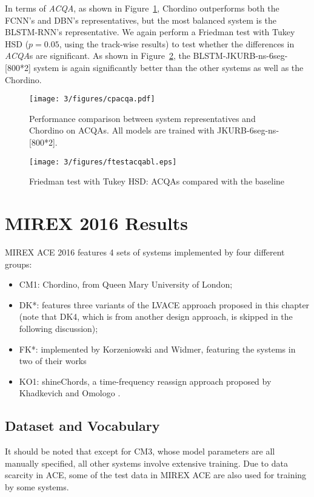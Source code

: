 In terms of \textit{ACQA}, as shown in Figure~\ref{fig:3-acqachordino}, Chordino outperforms both the FCNN's and DBN's representatives, but the most balanced system is the BLSTM-RNN's representative. We again perform a Friedman test with Tukey HSD ($p=0.05$, using the track-wise results) to test whether the differences in \textit{ACQA}s are significant. As shown in Figure~\ref{fig:3-friedmanacqabl}, the BLSTM-JKURB-ns-6seg-[800*2] system is again significantly better than the other systems as well as the Chordino.
\begin{figure}[h!]
	\centering
	\texttt{[image: 3/figures/cpacqa.pdf]}
	\caption{Performance comparison between system representatives and Chordino on ACQAs. All models are trained with JKURB-6seg-ns-[800*2].}
	\label{fig:3-acqachordino}
\end{figure}
\begin{figure}[h!]
	\centering
	\texttt{[image: 3/figures/ftestacqabl.eps]}
	\caption{Friedman test with Tukey HSD: ACQAs compared with the baseline}
	\label{fig:3-friedmanacqabl}
\end{figure}

\section{MIREX 2016 Results}
MIREX ACE 2016 features 4 sets of systems implemented by four different groups:
\begin{itemize}
\item CM1: Chordino, from Queen Mary University of London;
\item DK*: features three variants of the LVACE approach proposed in this chapter \cite{deng2016mirex} (note that DK4, which is from another design approach, is skipped in the following discussion);
\item FK*: implemented by Korzeniowski and Widmer, featuring the systems in two of their works \cite{Korzeniowski2016feature,Korzeniowski2016convolutional}
\item KO1: shineChords, a time-frequency reassign approach proposed by Khadkevich and Omologo \cite{khadkevich2011time}.
\end{itemize}

\subsection{Dataset and Vocabulary}
It should be noted that except for CM3, whose model parameters are all manually specified, all other systems involve extensive training. Due to data scarcity in ACE, some of the test data in MIREX ACE are also used for training by some systems.

